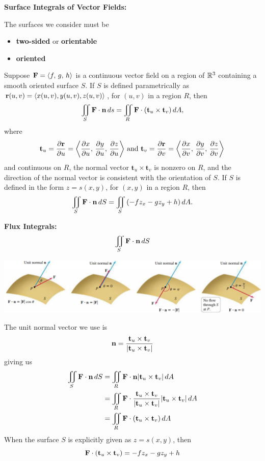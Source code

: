 \documentclass[mathNotesPreamble]{subfiles}
\begin{document}
  \noindent
  \textbf{Surface Integrals of Vector Fields:}

  The surfaces we consider must be 
  \begin{itemize}
    \item \textbf{two-sided} or \textbf{orientable}
    \item \textbf{oriented}
  \end{itemize}
  

  \begin{defn*}
    Suppose $\mathbf F={\left\langle f,\,g,\,h \right\rangle}$ is a continuous vector field on a region of $\mathbb{R}^3$ containing a smooth oriented surface $S$. If $S$ is defined parametrically as ${\mathbf{r}}(u,v)={\left\langle x(u,v),y(u,v),z(u,v) \right\rangle}$, for $(u,v)$ in a region $R$, then
      \[\iint\limits_S \mathbf F\cdot{\mathbf{n}}\,ds = \iint\limits_R \mathbf F\cdot{\left(\mathbf t_u\times\mathbf t_v\right)}\,dA,\]
    where 
      \[\displaystyle\mathbf t_u=\frac{\partial {\mathbf{r}}}{\partial u}={\left\langle \frac{\partial x}{\partial u},\,\frac{\partial y}{\partial u},\,\frac{\partial z}{\partial u} \right\rangle}
      \textnormal{ and }
      \displaystyle\mathbf t_v=\frac{\partial {\mathbf{r}}}{\partial v}={\left\langle \frac{\partial x}{\partial v},\,\frac{\partial y}{\partial v},\,\frac{\partial z}{\partial v} \right\rangle}\] 
    and continuous on $R$, the normal vector $\mathbf t_u\times\mathbf t_v$ is nonzero on $R$, and the direction of the normal vector is consistent with the orientation of $S$. If $S$ is defined in the form $z=s(x,y)$, for $(x,y)$ in a region $R$, then 
      \[\iint\limits_S \mathbf F\cdot{\mathbf{n}}\,dS=\iint\limits_S {\left(-fz_x-gz_y+h\right)}\,dA.\]
  \end{defn*}
  \pagebreak

  \textbf{Flux Integrals:}
    \[\iint\limits_S \mathbf F\cdot{\mathbf{n}}\,dS\]
  \begin{center}
    \includegraphics[width=0.95\linewidth]{images/briggs_17_06/fig17_57}
  \end{center}
  The unit normal vector we use is
    \[{\mathbf{n}}=\frac{\mathbf t_u\times\mathbf t_v}{{\left\vert\mathbf t_u\times\mathbf t_v\right\vert}}\]
  giving us
    \begin{align*}
      \iint\limits_S \mathbf F\cdot{\mathbf{n}}\,dS&= \iint\limits_R \mathbf F\cdot{\mathbf{n}} {\left\vert\mathbf t_u\times\mathbf t_v\right\vert}\,dA\\
      &= \iint\limits_R \mathbf F\cdot\frac{\mathbf t_u\times\mathbf t_v}{{\left\vert\mathbf t_u\times\mathbf t_v\right\vert}} {\left\vert\mathbf t_u\times\mathbf t_v\right\vert}\,dA\\
      &= \iint\limits_R \mathbf F\cdot{\left(\mathbf t_u\times\mathbf t_v\right)}\,dA
    \end{align*}
  When the surface $S$ is explicitly given as $z=s(x,y)$, then 
    \[\mathbf F\cdot{\left(\mathbf t_u\times\mathbf t_v\right)}=-fz_x-gz_y+h\]
  \pagebreak
\end{document}
